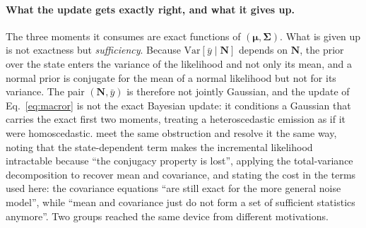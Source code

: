 \paragraph{What the update gets exactly right, and what it gives up.}
The three moments it consumes are exact functions of $(\bm{\mu},\bm{\Sigma})$.
What is given up is not exactness but \emph{sufficiency}. Because
$\mathrm{Var}[\bar y\mid\mathbf{N}]$ depends on $\mathbf{N}$, the prior over the state enters the
variance of the likelihood and not only its mean, and a normal prior is conjugate for the mean of a
normal likelihood but not for its variance. The pair $(\mathbf{N},\bar y)$ is therefore not jointly
Gaussian, and the update of Eq.~\ref{eq:macror} is not the exact Bayesian update: it conditions a
Gaussian that carries the exact first two moments, treating a heteroscedastic emission as if it
were homoscedastic. \citet{munch2022bayesian} meet the same obstruction and resolve it the same
way, noting that the state-dependent term makes the incremental likelihood intractable because
``the conjugacy property is lost'', applying the total-variance decomposition to recover mean and
covariance, and stating the cost in the terms used here: the covariance equations ``are still exact
for the more general noise model'', while ``mean and covariance just do not form a set of sufficient
statistics anymore''. Two groups reached the same device from different motivations.

